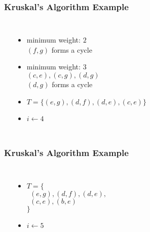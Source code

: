 \documentclass[dvipsnames]{beamer}
\begin{document}
\begin{frame}
  \frametitle{Kruskal's Algorithm Example}

  \begin{example}[$3 < 6$]
    \begin{columns}
      \begin{center}
      \end{center}

      \pause
      \begin{itemize}
        \item minimum weight: $2$\\
          $(f,g)$ forms a cycle

        \pause
        \item minimum weight: $3$\\
          $(c,e), (c,g), (d,g)$\\
          $(d,g)$ forms a cycle

        \pause
        \item $T = \{ (e,g), (d,f), (d,e), (c,e) \}$
        \item $i \leftarrow 4$
      \end{itemize}
    \end{columns}
  \end{example}
\end{frame}

\begin{frame}
  \frametitle{Kruskal's Algorithm Example}

  \begin{example}[$4 < 6$]
    \begin{columns}
      \begin{center}
      \end{center}

      \pause
      \begin{itemize}
        \item $T = \{$\\
          $~~(e,g), (d,f), (d,e),$\\
          $~~(c,e), (b,e)$\\
          $\}$
        \item $i \leftarrow 5$
      \end{itemize}
    \end{columns}
  \end{example}
\end{frame}
\end{document}
